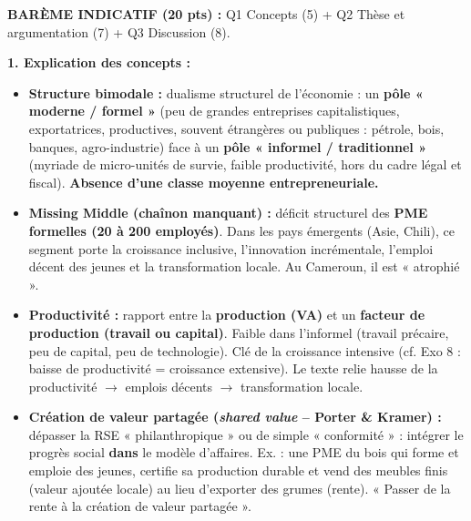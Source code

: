 \documentclass[11pt]{article}
\begin{document}
\begin{corrige}
\textbf{BARÈME INDICATIF (20 pts) :} Q1 Concepts (5) + Q2 Thèse et argumentation (7) + Q3 Discussion (8).

\textbf{1. Explication des concepts :}
\begin{itemize}
    \item \textbf{Structure bimodale :} dualisme structurel de l'économie : un \textbf{pôle « moderne / formel »} (peu de grandes entreprises capitalistiques, exportatrices, productives, souvent étrangères ou publiques : pétrole, bois, banques, agro-industrie) face à un \textbf{pôle « informel / traditionnel »} (myriade de micro-unités de survie, faible productivité, hors du cadre légal et fiscal). \textbf{Absence d'une classe moyenne entrepreneuriale.}
    \item \textbf{Missing Middle (chaînon manquant) :} déficit structurel des \textbf{PME formelles (20 à 200 employés)}. Dans les pays émergents (Asie, Chili), ce segment porte la croissance inclusive, l'innovation incrémentale, l'emploi décent des jeunes et la transformation locale. Au Cameroun, il est « atrophié ».
    \item \textbf{Productivité :} rapport entre la \textbf{production (VA)} et un \textbf{facteur de production (travail ou capital)}. Faible dans l'informel (travail précaire, peu de capital, peu de technologie). Clé de la croissance intensive (cf. Exo 8 : baisse de productivité = croissance extensive). Le texte relie hausse de la productivité $\rightarrow$ emplois décents $\rightarrow$ transformation locale.
    \item \textbf{Création de valeur partagée (\emph{shared value} -- Porter \& Kramer) :} dépasser la RSE « philanthropique » ou de simple « conformité » : intégrer le progrès social \textbf{dans} le modèle d'affaires. Ex. : une PME du bois qui forme et emploie des jeunes, certifie sa production durable et vend des meubles finis (valeur ajoutée locale) au lieu d'exporter des grumes (rente). « Passer de la rente à la création de valeur partagée ».
\end{itemize}


\end{corrige}
\end{document}
